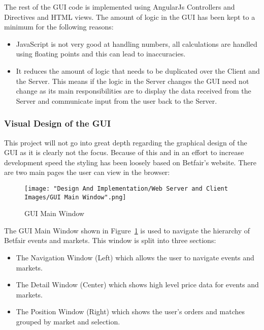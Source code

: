 		The rest of the GUI code is implemented using AngularJs Controllers and Directives and HTML views. The amount of logic in the GUI has been kept to a minimum for the following reasons:
		\begin{itemize}
			\item JavaScript is not very good at handling numbers, all calculations are handled using floating points and this can lead to inaccuracies\cite{JavaScriptFloatingPoint}.
			\item It reduces the amount of logic that needs to be duplicated over the Client and the Server. This means if the logic in the Server changes the GUI need not change as its main responsibilities are to display the data received from the Server and communicate input from the user back to the Server.
		\end{itemize}
		
		\subsubsection{Visual Design of the GUI}
		
			This project will not go into great depth regarding the graphical design of the GUI as it is clearly not the focus. Because of this and in an effort to increase development speed the styling has been loosely based on Betfair's website. There are two main pages the user can view in the browser:
			
			\begin{figure}[H]
				\texttt{[image: "Design And Implementation/Web Server and Client Images/GUI Main Window".png]}
				\centering
				\caption{GUI Main Window}
    				\label{fig:guiMainWindow}
			\end{figure}	
			
			The GUI Main Window shown in Figure~\ref{fig:guiMainWindow} is used to navigate the hierarchy of Betfair events and markets. This window is split into three sections:
			
			\begin{itemize}
				\item The Navigation Window (Left) which allows the user to navigate events and markets.
				\item The Detail Window (Center) which shows high level price data for events and markets.
				\item The Position Window (Right) which shows the user's orders and matches grouped by market and selection.		
			\end{itemize}


